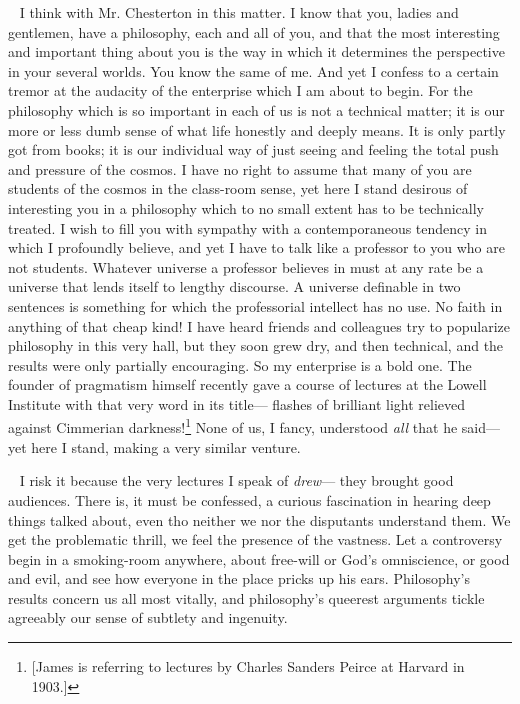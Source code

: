 \documentclass[12pt]{article}
\newcounter{wjparagraph}[section]
\newcommand*{\wjparagraph}{\stepcounter{wjparagraph}~\marginpar{\tiny\arabic{wjparagraph} }}
\begin{document}
\wjparagraph
I think with Mr. Chesterton in this matter. I know that you, ladies and gentlemen, have a philosophy, each and all of you, and that the most interesting and important thing about you is the way in which it determines the perspective in your several worlds. You know the same of me. And yet I confess to a certain tremor at the audacity of the enterprise which I am about to begin. For the philosophy which is so important in each of us is not a technical matter; it is our more or less dumb sense of what life honestly and deeply means. It is only partly got from books; it is our individual way of just seeing and feeling the total push and pressure of the cosmos. I have no right to assume that many of you are students of the cosmos in the class-room sense, yet here I stand desirous of interesting you in a philosophy which to no small extent has to be technically treated. I wish to fill you with sympathy with a contemporaneous tendency in which I profoundly believe, and yet I have to talk like a professor to you who are not students. Whatever universe a professor believes in must at any rate be a universe that lends itself to lengthy discourse. A universe definable in two sentences is something for which the professorial intellect has no use. No faith in anything of that cheap kind! I have heard friends and colleagues try to popularize philosophy in this very hall, but they soon grew dry, and then technical, and the results were only partially encouraging. So my enterprise is a bold one. The founder of pragmatism himself recently gave a course of lectures at the Lowell Institute with that very word in its title--- flashes of brilliant light relieved against Cimmerian darkness!\footnote{[James is referring to lectures by Charles Sanders Peirce at Harvard in 1903.]} None of us, I fancy, understood \emph{all} that he said--- yet here I stand, making a very similar venture.

\wjparagraph
I risk it because the very lectures I speak of \emph{drew}--- they brought good audiences. There is, it must be confessed, a curious fascination in hearing deep things talked about, even tho neither we nor the disputants understand them. We get the problematic thrill, we feel the presence of the vastness. Let a controversy begin in a smoking-room anywhere, about free-will or God's omniscience, or good and evil, and see how everyone in the place pricks up his ears. Philosophy's results concern us all most vitally, and philosophy's queerest arguments tickle agreeably our sense of subtlety and ingenuity.
\end{document}
